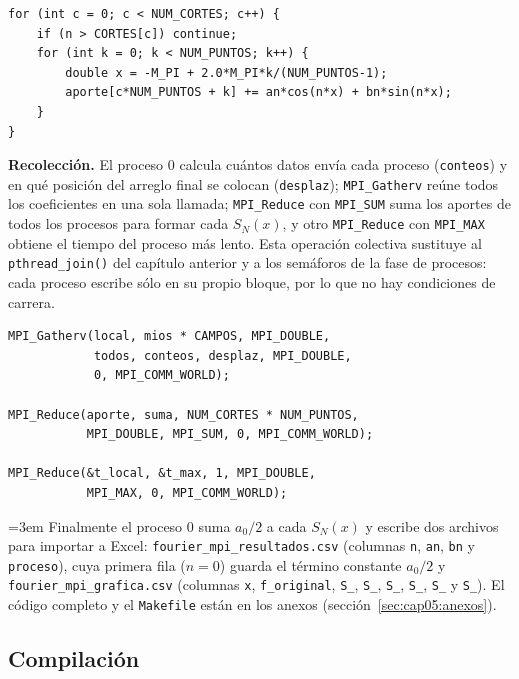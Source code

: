 \begin{lstlisting}[style=C]
for (int c = 0; c < NUM_CORTES; c++) {
    if (n > CORTES[c]) continue;
    for (int k = 0; k < NUM_PUNTOS; k++) {
        double x = -M_PI + 2.0*M_PI*k/(NUM_PUNTOS-1);
        aporte[c*NUM_PUNTOS + k] += an*cos(n*x) + bn*sin(n*x);
    }
}
\end{lstlisting}

\textbf{Recolección.} El proceso $0$ calcula cuántos datos envía cada proceso (\texttt{conteos}) y en qué posición del arreglo final se colocan (\texttt{desplaz}); \texttt{MPI\_Gatherv} reúne todos los coeficientes en una sola llamada; \texttt{MPI\_Reduce} con \texttt{MPI\_SUM} suma los aportes de todos los procesos para formar cada $S_N(x)$, y otro \texttt{MPI\_Reduce} con \texttt{MPI\_MAX} obtiene el tiempo del proceso más lento. Esta operación colectiva sustituye al \texttt{pthread\_join()} del capítulo anterior y a los semáforos de la fase de procesos: cada proceso escribe sólo en su propio bloque, por lo que no hay condiciones de carrera.

\begin{lstlisting}[style=C]
MPI_Gatherv(local, mios * CAMPOS, MPI_DOUBLE,
            todos, conteos, desplaz, MPI_DOUBLE,
            0, MPI_COMM_WORLD);

MPI_Reduce(aporte, suma, NUM_CORTES * NUM_PUNTOS,
           MPI_DOUBLE, MPI_SUM, 0, MPI_COMM_WORLD);

MPI_Reduce(&t_local, &t_max, 1, MPI_DOUBLE,
           MPI_MAX, 0, MPI_COMM_WORLD);
\end{lstlisting}

{\emergencystretch=3em Finalmente el proceso $0$ suma $a_0/2$ a cada $S_N(x)$ y escribe dos archivos para importar a Excel: \texttt{fourier\_\allowbreak mpi\_\allowbreak resultados.csv} (columnas \texttt{n}, \texttt{an}, \texttt{bn} y \texttt{proceso}), cuya primera fila ($n=0$) guarda el término constante $a_0/2$ y \texttt{fourier\_\allowbreak mpi\_\allowbreak grafica.csv} (columnas \texttt{x}, \texttt{f\_\allowbreak original}, \texttt{S\_}, \texttt{S\_}, \texttt{S\_}, \texttt{S\_}, \texttt{S\_} y \texttt{S\_}). El código completo y el \texttt{Makefile} están en los anexos (sección~\ref{sec:cap05:anexos}).\par}

\subsection{Compilación}

